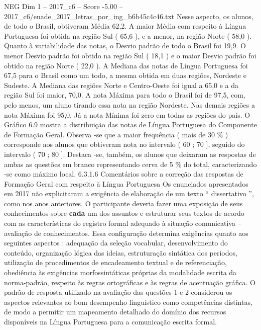 \begin{textsample}{NEG Dim 1 – 2017\_c6 – Score -5.00 – 2017\_c6/enade\_2017\_letras\_por\_ing\_b6b45c4c46.txt}
Nesse aspecto, os alunos, de todo o Brasil, obtiveram Média 62,2.
A maior Média com respeito à Língua Portuguesa foi obtida na região Sul ( 65,6 ), e a menor, na região Norte ( 58,0 ).
Quanto à variabilidade das notas, o Desvio padrão de todo o Brasil foi 19,9.
O menor Desvio padrão foi obtido na região Sul ( 18,1 ) e o maior Desvio padrão foi obtido na região Norte ( 22,0 ).
A Mediana das notas de Língua Portuguesa foi 67,5 para o Brasil como um todo, a mesma obtida em duas regiões, Nordeste e Sudeste.
A Mediana das regiões Norte e Centro-Oeste foi igual a 65,0 e a da região Sul foi maior, 70,0.
A nota Máxima para todo o Brasil foi de 97,5, com, pelo menos, um aluno tirando essa nota na região Nordeste.
Nas demais regiões a nota Máxima foi 95,0.
Já a nota Mínima foi zero em todas as regiões do país.
O Gráfico 6.9 mostra a distribuição das notas de Língua Portuguesa do Componente de Formação Geral.
Observa -se que a maior frequência ( mais de 30 \% ) corresponde aos alunos que obtiveram nota no intervalo ( 60 ; 70 ], seguido do intervalo ( 70 ; 80 ].
Destaca -se, também, os alunos que deixaram as respostas de ambas as questões em branco representando cerva de 5 \% do total, caracterizando -se como máximo local. 6.3.1.6 Comentários sobre a correção das respostas de Formação Geral com respeito à Língua Portuguesa Os enunciados apresentados em 2017 não explicitaram a exigência de elaboração de um texto “ dissertativo ”, como nos anos anteriores.
O participante deveria fazer uma exposição de seus conhecimentos sobre \textbf{cada} um dos assuntos e estruturar seus textos de acordo com as características do registro formal adequado à situação comunicativa – avaliação de conhecimentos.
Essa configuração determina exigências quanto aos seguintes aspectos : adequação da seleção vocabular, desenvolvimento do conteúdo, organização lógica das ideias, estruturação sintática dos períodos, utilização de procedimentos de encadeamento textual e de referenciação, obediência às exigências morfossintáticas próprias da modalidade escrita da norma-padrão, respeito às regras ortográficas e às regras de acentuação gráfica.
O padrão de resposta utilizado na avaliação das questões 1 e 2 considerou os aspectos relevantes ao bom desempenho linguístico como competências distintas, de modo a permitir um mapeamento detalhado do domínio dos recursos disponíveis na Língua Portuguesa para a comunicação escrita formal.

\end{textsample}
